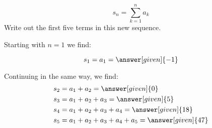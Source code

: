 \documentclass{ximera}
\begin{document}
\begin{exercise}
\begin{exercise}
\[
s_n = \sum_{k=1}^n a_k 
\]
Write out the first five terms in this new sequence.

Starting with $n=1$ we find:

\[      s_1 = a_1 = \answer[given]{-1}       \]
      
Continuing in the same way, we find:     
     \begin{align*}
      	s_2 &=  a_1 +a_2 = \answer[given]{0}  \\ 
	s_3 &=  a_1 +a_2 + a_3 = \answer[given]{5}   \\ 
	s_4 &=  a_1 +a_2 +a_3 +a_4= \answer[given]{18}  \\ 
	s_5 &=  a_1 +a_2 +a_3+a_4+a_5= \answer[given]{47}    
    \end{align*}

\end{exercise}   
    
    \end{exercise}
\end{document}
